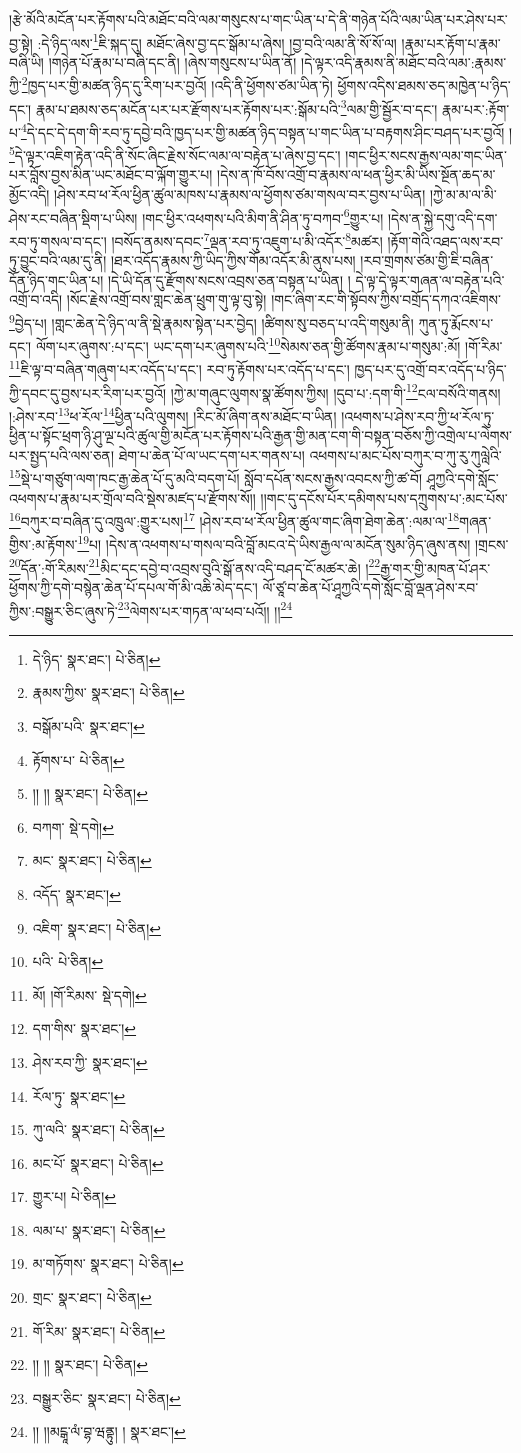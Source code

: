 །རྩེ་མོའི་མངོན་པར་རྟོགས་པའི་མཐོང་བའི་ལམ་གསུངས་པ་གང་ཡིན་པ་དེ་ནི་གཉེན་པོའི་ལམ་ཡིན་པར་ཤེས་པར་བྱ་སྟེ། :དེ་ཉིད་ལས་\footnote{དེ་ཉིད་  སྣར་ཐང་།  པེ་ཅིན། }ཇི་སྐད་དུ། མཐོང་ཞེས་བྱ་དང་སྒོམ་པ་ཞེས། །བྱ་བའི་ལམ་ནི་སོ་སོ་ལ། །རྣམ་པར་རྟོག་པ་རྣམ་བཞི་ཡི། །གཉེན་པོ་རྣམ་པ་བཞི་དང་ནི། །ཞེས་གསུངས་པ་ཡིན་ནོ། །དེ་ལྟར་འདི་རྣམས་ནི་མཐོང་བའི་ལམ་:རྣམས་ཀྱི་\footnote{རྣམས་ཀྱིས་  སྣར་ཐང་།  པེ་ཅིན། }ཁྱད་པར་གྱི་མཚན་ཉིད་དུ་རིག་པར་བྱའོ། །འདི་ནི་ཕྱོགས་ཙམ་ཡིན་ཏེ། ཕྱོགས་འདིས་ཐམས་ཅད་མཁྱེན་པ་ཉིད་དང་། རྣམ་པ་ཐམས་ཅད་མངོན་པར་པར་རྫོགས་པར་རྟོགས་པར་:སྒོམ་པའི་\footnote{བསྒོམ་པའི་  སྣར་ཐང་། }ལམ་གྱི་སྦྱོར་བ་དང་། རྣམ་པར་:རྟོག་པ་\footnote{རྟོགས་པ་  པེ་ཅིན། }དེ་དང་དེ་དག་གི་རབ་ཏུ་དབྱེ་བའི་ཁྱད་པར་གྱི་མཚན་ཉིད་བསྟན་པ་གང་ཡིན་པ་བརྟགས་ཤིང་བཤད་པར་བྱའོ། །\footnote{།། །།  སྣར་ཐང་།  པེ་ཅིན། }དེ་ལྟར་འཇིག་རྟེན་འདི་ནི་སོང་ཞིང་རྗེས་སོང་ལམ་ལ་བརྟེན་པ་ཞེས་བྱ་དང་། །གང་ཕྱིར་སངས་རྒྱས་ལམ་གང་ཡིན་པར་བློས་བྱས་མིན་ཡང་མཐོང་བ་ལྐོག་གྱུར་པ། །དེས་ན་ཁོ་བོས་འགྲོ་བ་རྣམས་ལ་ཕན་ཕྱིར་མི་ཡིས་སྔོན་ཆད་མ་མྱོང་འདི། །ཤེས་རབ་ཕ་རོལ་ཕྱིན་ཚུལ་མཁས་པ་རྣམས་ལ་ཕྱོགས་ཙམ་གསལ་བར་བྱས་པ་ཡིན། །ཀྱེ་མ་མ་ལ་མི་ཤེས་རང་བཞིན་སྡིག་པ་ཡིས། །གང་ཕྱིར་འཕགས་པའི་མིག་ནི་ཤིན་ཏུ་བཀབ་\footnote{བཀག་  སྡེ་དགེ། }གྱུར་པ། །དེས་ན་སྐྱེ་དགུ་འདི་དག་རབ་ཏུ་གསལ་བ་དང་། །བསོད་ནམས་དབང་\footnote{མང་  སྣར་ཐང་།  པེ་ཅིན། }ལྡན་རབ་ཏུ་འཇུག་པ་མི་འདོར་\footnote{འདོད་  སྣར་ཐང་། }མཚར། །རྟོག་གེའི་འཐད་ལས་རབ་ཏུ་བྱུང་བའི་ལམ་དུ་ནི། །ཐར་འདོད་རྣམས་ཀྱི་ཡིད་ཀྱིས་གོམ་འདོར་མི་ནུས་པས། །རབ་གྲགས་ཙམ་གྱི་ཇི་བཞིན་དོན་ཉིད་གང་ཡིན་པ། །དེ་ཡི་དོན་དུ་རྫོགས་སངས་འབྲས་ཅན་བསྟན་པ་ཡིན། །
དེ་ལྟ་དེ་ལྟར་གཞན་ལ་བརྟེན་པའི་འགྲོ་བ་འདི། །སོང་རྗེས་འགྲོ་བས་གླང་ཆེན་ཕྲུག་གུ་ལྟ་བུ་སྟེ། །གང་ཞིག་རང་གི་སྟོབས་ཀྱིས་བགྲོད་དཀའ་འཇིགས་\footnote{འཇིག་  སྣར་ཐང་།  པེ་ཅིན། }བྱེད་པ། །གླང་ཆེན་དེ་ཉིད་ལ་ནི་སྡེ་རྣམས་སྟེན་པར་བྱེད། །ཚིགས་སུ་བཅད་པ་འདི་གསུམ་ནི། ཀུན་ཏུ་རྨོངས་པ་དང་། ལོག་པར་ཞུགས་:པ་དང་། ཡང་དག་པར་ཞུགས་པའི་\footnote{པའི་  པེ་ཅིན། }སེམས་ཅན་གྱི་ཚོགས་རྣམ་པ་གསུམ་:མོ། །གོ་རིམ་\footnote{མོ། །གོ་རིམས་  སྡེ་དགེ། }ཇི་ལྟ་བ་བཞིན་གཞུག་པར་འདོད་པ་དང་། རབ་ཏུ་རྟོགས་པར་འདོད་པ་དང་། ཁྱད་པར་དུ་འགྲོ་བར་འདོད་པ་ཉིད་ཀྱི་དབང་དུ་བྱས་པར་རིག་པར་བྱའོ། །ཀྱེ་མ་གཞུང་ལུགས་སྣ་ཚོགས་ཀྱིས། །དུབ་པ་:དག་གི་\footnote{དག་གིས་  སྣར་ཐང་། }ངལ་བསོའི་གནས། །:ཤེས་རབ་\footnote{ཤེས་རབ་ཀྱི་  སྣར་ཐང་། }ཕ་རོལ་\footnote{རོལ་ཏུ་  སྣར་ཐང་། }ཕྱིན་པའི་ལུགས། །རིང་མོ་ཞིག་ནས་མཐོང་བ་ཡིན། །འཕགས་པ་ཤེས་རབ་ཀྱི་ཕ་རོལ་ཏུ་ཕྱིན་པ་སྟོང་ཕྲག་ཉི་ཤུ་ལྔ་པའི་ཚུལ་གྱི་མངོན་པར་རྟོགས་པའི་རྒྱན་གྱི་མན་ངག་གི་བསྟན་བཅོས་ཀྱི་འགྲེལ་པ་ལེགས་པར་སྤྱད་པའི་ལས་ཅན། ཐེག་པ་ཆེན་པོ་ལ་ཡང་དག་པར་གནས་པ། འཕགས་པ་མང་པོས་བཀུར་བ་ཀུ་རུ་ཀུལླེའི་\footnote{ཀུ་ལའི་  སྣར་ཐང་།  པེ་ཅིན། }སྡེ་པ་གཙུག་ལག་ཁང་རྒྱ་ཆེན་པོ་དུ་མའི་བདག་པོ། སློབ་དཔོན་སངས་རྒྱས་འབངས་ཀྱི་ཚ་བོ། ཤཱཀྱའི་དགེ་སློང་འཕགས་པ་རྣམ་པར་གྲོལ་བའི་སྡེས་མཛད་པ་རྫོགས་སོ།། །།གང་དུ་དངོས་པོར་དམིགས་པས་དཀྲུགས་པ་:མང་པོས་\footnote{མང་པོ་  སྣར་ཐང་།  པེ་ཅིན། }བཀུར་བ་བཞིན་དུ་འཁྲུལ་:གྱུར་པས།\footnote{གྱུར་པ།  པེ་ཅིན། } །ཤེས་རབ་ཕ་རོལ་ཕྱིན་ཚུལ་གང་ཞིག་ཐེག་ཆེན་:ལམ་ལ་\footnote{ལམ་པ་  སྣར་ཐང་།  པེ་ཅིན། }གཞན་གྱིས་:མ་རྟོགས་\footnote{མ་གཏོགས་  སྣར་ཐང་།  པེ་ཅིན། }པ། །དེས་ན་འཕགས་པ་གསལ་བའི་བློ་མངའ་དེ་ཡིས་རྒྱལ་ལ་མངོན་སུམ་ཉིད་ཞུས་ནས། །གྲངས་\footnote{གྲང་  སྣར་ཐང་།  པེ་ཅིན། }དོན་:གོ་རིམས་\footnote{གོ་རིམ་  སྣར་ཐང་།  པེ་ཅིན། }མིང་དང་དབྱེ་བ་འབྲས་བུའི་སྒོ་ནས་འདི་བཤད་ངོ་མཚར་ཆེ། །\footnote{།། །།  སྣར་ཐང་།  པེ་ཅིན། }རྒྱ་གར་གྱི་མཁན་པོ་ཤར་ཕྱོགས་ཀྱི་དགེ་བསྙེན་ཆེན་པོ་དཔལ་གོ་མི་འཆི་མེད་དང་། ལོ་ཙཱ་བ་ཆེན་པོ་ཤཱཀྱའི་དགེ་སློང་བློ་ལྡན་ཤེས་རབ་ཀྱིས་:བསྒྱུར་ཅིང་ཞུས་ཏེ་\footnote{བསྒྱུར་ཅིང་  སྣར་ཐང་།  པེ་ཅིན། }ལེགས་པར་གཏན་ལ་ཕབ་པའོ།། །།\footnote{།། །།མངྒཱ་ལཾ་བྷ་ཝནྟུ། །  སྣར་ཐང་། }
